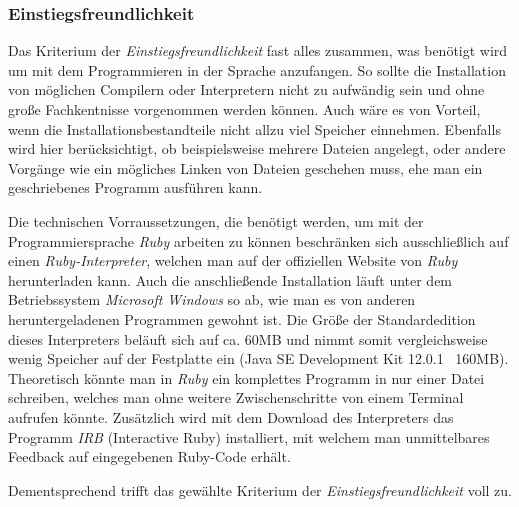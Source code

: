 \documentclass[12pt,DIV=14, version=first, BCOR=10mm,a4paper,twoside,parskip=half-,headsepline,headinclude]{scrartcl}
\begin{document}
\subsubsection{Einstiegsfreundlichkeit} 

\begin{flushleft}
Das Kriterium der \textit{Einstiegsfreundlichkeit} fast alles zusammen, was benötigt wird um mit dem Programmieren in der Sprache anzufangen. So sollte die Installation von möglichen Compilern oder Interpretern nicht zu aufwändig sein und ohne große Fachkentnisse vorgenommen werden können. Auch wäre es von Vorteil, wenn die Installationsbestandteile nicht allzu viel Speicher einnehmen. Ebenfalls wird hier berücksichtigt, ob beispielsweise mehrere Dateien angelegt, oder andere Vorgänge wie ein mögliches Linken von Dateien geschehen muss, ehe man ein geschriebenes Programm ausführen kann.

Die technischen Vorraussetzungen, die benötigt werden, um mit der Programmiersprache \textit{\glqq Ruby\grqq} arbeiten zu können beschränken sich ausschließlich auf einen \textit{Ruby-Interpreter}, welchen man auf der offiziellen Website von \textit{\glqq Ruby\grqq} herunterladen kann. Auch die anschließende Installation läuft unter dem Betriebssystem \textit{Microsoft Windows} so ab, wie man es von anderen heruntergeladenen Programmen gewohnt ist. Die Größe der Standardedition dieses Interpreters beläuft sich auf ca. 60MB und nimmt somit vergleichsweise wenig Speicher auf der Festplatte ein (Java SE Development Kit 12.0.1 ~160MB).
Theoretisch könnte man in \textit{\glqq Ruby\grqq} ein komplettes Programm in nur einer Datei schreiben, welches man ohne weitere Zwischenschritte von einem Terminal aufrufen könnte. Zusätzlich wird mit dem Download des Interpreters das Programm \textit{IRB} (Interactive Ruby) installiert, mit welchem man unmittelbares Feedback auf eingegebenen Ruby-Code erhält.

Dementsprechend trifft das gewählte Kriterium der \textit{Einstiegsfreundlichkeit} voll zu.
\end{flushleft}
\end{document}
